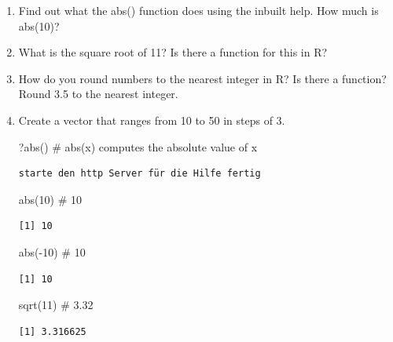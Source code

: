 \documentclass[
  letterpaper,
  DIV=11,
  numbers=noendperiod]{scrartcl}
\newenvironment{Shaded}{\begin{snugshade}}{\end{snugshade}}
\newcommand{\CommentTok}[1]{\textcolor[rgb]{0.37,0.37,0.37}{#1}}
\newcommand{\DecValTok}[1]{\textcolor[rgb]{0.68,0.00,0.00}{#1}}
\newcommand{\FunctionTok}[1]{\textcolor[rgb]{0.28,0.35,0.67}{#1}}
\newcommand{\NormalTok}[1]{\textcolor[rgb]{0.00,0.23,0.31}{#1}}
\newcommand{\SpecialCharTok}[1]{\textcolor[rgb]{0.37,0.37,0.37}{#1}}
\begin{document}
\begin{enumerate}
\def\labelenumi{\arabic{enumi}.}
\item
  Find out what the abs() function does using the inbuilt help. How much
  is abs(10)?
\item
  What is the square root of 11? Is there a function for this in R?
\item
  How do you round numbers to the nearest integer in R? Is there a
  function? Round 3.5 to the nearest integer.
\item
  Create a vector that ranges from 10 to 50 in steps of 3.

\begin{Shaded}
\begin{Highlighting}[]
\NormalTok{?}\FunctionTok{abs}\NormalTok{() }\CommentTok{\# abs(x) computes the absolute value of x}
\end{Highlighting}
\end{Shaded}

\begin{verbatim}
starte den http Server für die Hilfe fertig
\end{verbatim}

\begin{Shaded}
\begin{Highlighting}[]
\FunctionTok{abs}\NormalTok{(}\DecValTok{10}\NormalTok{) }\CommentTok{\# 10}
\end{Highlighting}
\end{Shaded}

\begin{verbatim}
[1] 10
\end{verbatim}

\begin{Shaded}
\begin{Highlighting}[]
\FunctionTok{abs}\NormalTok{(}\SpecialCharTok{{-}}\DecValTok{10}\NormalTok{) }\CommentTok{\# 10}
\end{Highlighting}
\end{Shaded}

\begin{verbatim}
[1] 10
\end{verbatim}

\begin{Shaded}
\begin{Highlighting}[]
\FunctionTok{sqrt}\NormalTok{(}\DecValTok{11}\NormalTok{) }\CommentTok{\# 3.32}
\end{Highlighting}
\end{Shaded}

\begin{verbatim}
[1] 3.316625
\end{verbatim}


\end{enumerate}
\end{document}
